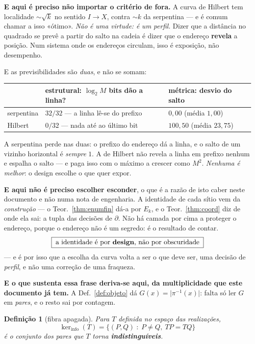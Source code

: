\documentclass[11pt,a4paper]{article}
\newtheorem{definicao}[teorema]{Definição}
\begin{document}
\medskip\noindent\textbf{E aqui é preciso não importar o critério de fora.} A curva
de Hilbert tem localidade $\sim\sqrt{k}$ no sentido $I\to X$, contra $\sim k$ da
serpentina --- e é comum chamar a isso «ótimo». \emph{Não é uma virtude: é um
perfil.} Dizer que a distância no quadrado se prevê a partir do salto na cadeia é
dizer que o endereço \textbf{revela} a posição. Num sistema onde os endereços
circulam, isso é exposição, não desempenho.

\medskip\noindent E as previsibilidades são \emph{duas}, e não se somam:
\begin{center}\small
\begin{tabular}{@{}lll@{}}
\toprule
 & \textbf{estrutural}: $\log_2 M$ bits dão a linha? & \textbf{métrica}: desvio do salto\\
\midrule
serpentina & $32/32$ --- a linha lê-se do prefixo & $0{,}00$ (média $1{,}00$)\\
Hilbert & $0/32$ --- nada até ao último bit & $100{,}50$ (média $23{,}75$)\\
\bottomrule
\end{tabular}
\end{center}
A serpentina perde nas duas: o prefixo do endereço dá a linha, e o salto de um
vizinho horizontal é \emph{sempre} $1$. A de Hilbert não revela a linha em prefixo
nenhum e espalha o salto --- e paga isso com o máximo a crescer como $M^{2}$.
\emph{Nenhuma é melhor}: o design escolhe o que quer expor.

\medskip\noindent\textbf{E aqui não é preciso escolher esconder}, o que é a razão
de isto caber neste documento e não numa nota de engenharia. A identidade de cada
sítio vem da \emph{construção} --- o Teor.~\ref{thm:enumfin} dá-a por $E_k$, e o
Teor.~\ref{thm:coord} diz de onde ela sai: a tupla das decisões de $\partial$. Não
há camada por cima a proteger o endereço, porque o endereço não é um segredo: é o
resultado de contar.
\[
\boxed{\;\text{a identidade é por \textbf{design}, não por obscuridade}\;}
\]
--- e é por isso que a escolha da curva volta a ser o que deve ser, uma decisão de
\emph{perfil}, e não uma correção de uma fraqueza.

\medskip\noindent\textbf{E o que sustenta essa frase deriva-se aqui, da
multiplicidade que este documento já tem.} A Def.~\ref{def:objeto} dá
$G(x)=\lvert\pi^{-1}(x)\rvert$: falta só ler $G$ em \emph{pares}, e o resto sai
por contagem.

\begin{definicao}[fibra apagada]\label{def:kerinfo}
Para $T$ definida no espaço das realizações,
\[
\ker_{\mathrm{info}}(T)=\bigl\{(P,Q)\;:\;P\neq Q,\ TP=TQ\bigr\}
\]
é o conjunto dos pares que $T$ torna \textbf{indistinguíveis}.
\end{definicao}
\end{document}
